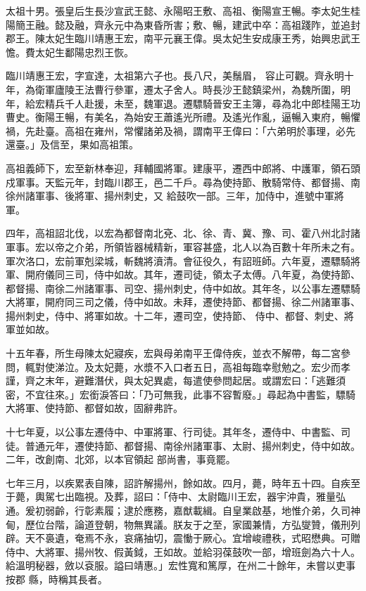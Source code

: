 
\begin{pinyinscope}

 太祖十男。張皇后生長沙宣武王懿、永陽昭王敷、高祖、衡陽宣王暢。李太妃生桂陽簡王融。懿及融，齊永元中為東昏所害；敷、暢，建武中卒：高祖踐阼，並追封郡王。陳太妃生臨川靖惠王宏，南平元襄王偉。吳太妃生安成康王秀，始興忠武王憺。費太妃生鄱陽忠烈王恢。



 臨川靖惠王宏，字宣達，太祖第六子也。長八尺，美鬚眉，
 容止可觀。齊永明十年，為衛軍廬陵王法曹行參軍，遷太子舍人。時長沙王懿鎮梁州，為魏所圍，明年，給宏精兵千人赴援，未至，魏軍退。遷驃騎晉安王主簿，尋為北中郎桂陽王功曹史。衡陽王暢，有美名，為始安王蕭遙光所禮。及遙光作亂，逼暢入東府，暢懼禍，先赴臺。高祖在雍州，常懼諸弟及禍，謂南平王偉曰：「六弟明於事理，必先還臺。」及信至，果如高祖策。



 高祖義師下，宏至新林奉迎，拜輔國將軍。建康平，遷西中郎將、中護軍，領石頭戍軍事。天監元年，封臨川郡王，邑二千戶。尋為使持節、散騎常侍、都督揚、南徐州諸軍事、後將軍、揚州刺史，又
 給鼓吹一部。三年，加侍中，進號中軍將軍。



 四年，高祖詔北伐，以宏為都督南北兗、北、徐、青、冀、豫、司、霍八州北討諸軍事。宏以帝之介弟，所領皆器械精新，軍容甚盛，北人以為百數十年所未之有。軍次洛口，宏前軍剋梁城，斬魏將濆清。會征役久，有詔班師。六年夏，遷驃騎將軍、開府儀同三司，侍中如故。其年，遷司徒，領太子太傅。八年夏，為使持節、都督揚、南徐二州諸軍事、司空、揚州刺史，侍中如故。其年冬，以公事左遷驃騎大將軍，開府同三司之儀，侍中如故。未拜，遷使持節、都督揚、徐二州諸軍事、揚州刺史，侍中、將軍如故。十二年，遷司空，使持節、
 侍中、都督、刺史、將軍並如故。



 十五年春，所生母陳太妃寢疾，宏與母弟南平王偉侍疾，並衣不解帶，每二宮參問，輒對使涕泣。及太妃薨，水漿不入口者五日，高祖每臨幸慰勉之。宏少而孝謹，齊之末年，避難潛伏，與太妃異處，每遣使參問起居。或謂宏曰：「逃難須密，不宜往來。」宏銜淚答曰：「乃可無我，此事不容暫廢。」尋起為中書監，驃騎大將軍、使持節、都督如故，固辭弗許。



 十七年夏，以公事左遷侍中、中軍將軍、行司徒。其年冬，遷侍中、中書監、司徒。普通元年，遷使持節、都督揚、南徐州諸軍事、太尉、揚州刺史，侍中如故。二年，改創南、北郊，以本官領起
 部尚書，事竟罷。



 七年三月，以疾累表自陳，詔許解揚州，餘如故。四月，薨，時年五十四。自疾至于薨，輿駕七出臨視。及葬，詔曰：「侍中、太尉臨川王宏，器宇沖貴，雅量弘通。爰初弱齡，行彰素履；逮於應務，嘉猷載緝。自皇業啟基，地惟介弟，久司神甸，歷位台階，論道登朝，物無異議。朕友于之至，家國兼情，方弘燮贊，儀刑列辟。天不裛遺，奄焉不永，哀痛抽切，震慟于厥心。宜增峻禮秩，式昭懋典。可贈侍中、大將軍、揚州牧、假黃鉞，王如故。並給羽葆鼓吹一部，增班劍為六十人。給溫明秘器，斂以袞服。謚曰靖惠。」宏性寬和篤厚，在州二十餘年，未嘗以吏事按郡
 縣，時稱其長者。




\end{pinyinscope}

